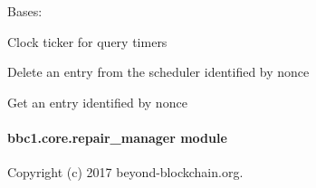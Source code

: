\documentclass[letterpaper,10pt,english]{sphinxmanual}
\begin{document}
\begin{fulllineitems}
\label{\detokenize{bbc1.core.query_management:bbc1.core.query_management.Ticker}}
Bases: 

Clock ticker for query timers

\begin{fulllineitems}
\label{\detokenize{bbc1.core.query_management:bbc1.core.query_management.Ticker.del_entry}}
Delete an entry from the scheduler identified by nonce

\end{fulllineitems}


\begin{fulllineitems}
\label{\detokenize{bbc1.core.query_management:bbc1.core.query_management.Ticker.get_entry}}
Get an entry identified by nonce

\end{fulllineitems}


\end{fulllineitems}


\begin{fulllineitems}
\label{\detokenize{bbc1.core.query_management:bbc1.core.query_management.get_ticker}}
\end{fulllineitems}



\paragraph{bbc1.core.repair\_manager module}
\label{\detokenize{bbc1.core.repair_manager::doc}}\label{\detokenize{bbc1.core.repair_manager:module-bbc1.core.repair_manager}}\label{\detokenize{bbc1.core.repair_manager:bbc1-core-repair-manager-module}}
Copyright (c) 2017 beyond-blockchain.org.
\end{document}

